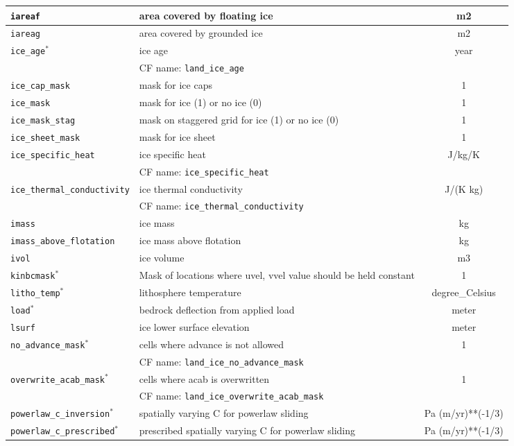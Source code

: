 \begin{center}
\begin{supertabular}{|l|p{8cm}|c|}
\hline
\texttt{iareaf} & area covered by floating ice & m2\\
\hline
\texttt{iareag} & area covered by grounded ice & m2\\
\hline
\texttt{ice\_age}$^\ast$ & ice age & year\\
&CF name: \texttt{land\_ice\_age}&\\
\hline
\texttt{ice\_cap\_mask} & mask for ice caps & 1\\
\hline
\texttt{ice\_mask} & mask for ice (1) or no ice (0) & 1\\
\hline
\texttt{ice\_mask\_stag} & mask on staggered grid for ice (1) or no ice (0) & 1\\
\hline
\texttt{ice\_sheet\_mask} & mask for ice sheet & 1\\
\hline
\texttt{ice\_specific\_heat} & ice specific heat & J/kg/K\\
&CF name: \texttt{ice\_specific\_heat}&\\
\hline
\texttt{ice\_thermal\_conductivity} & ice thermal conductivity & J/(K kg)\\
&CF name: \texttt{ice\_thermal\_conductivity}&\\
\hline
\texttt{imass} & ice mass & kg\\
\hline
\texttt{imass\_above\_flotation} & ice mass above flotation & kg\\
\hline
\texttt{ivol} & ice volume & m3\\
\hline
\texttt{kinbcmask}$^\ast$ & Mask of locations where uvel, vvel value should be held constant & 1\\
\hline
\texttt{litho\_temp}$^\ast$ & lithosphere temperature & degree\_Celsius\\
\hline
\texttt{load}$^\ast$ & bedrock deflection from applied load & meter\\
\hline
\texttt{lsurf} & ice lower surface elevation & meter\\
\hline
\texttt{no\_advance\_mask}$^\ast$ & cells where advance is not allowed & 1\\
&CF name: \texttt{land\_ice\_no\_advance\_mask}&\\
\hline
\texttt{overwrite\_acab\_mask}$^\ast$ & cells where acab is overwritten & 1\\
&CF name: \texttt{land\_ice\_overwrite\_acab\_mask}&\\
\hline
\texttt{powerlaw\_c\_inversion}$^\ast$ & spatially varying C for powerlaw sliding & Pa (m/yr)**(-1/3)\\
\hline
\texttt{powerlaw\_c\_prescribed}$^\ast$ & prescribed spatially varying C for powerlaw sliding & Pa (m/yr)**(-1/3)\\

\end{supertabular}
\end{center}
